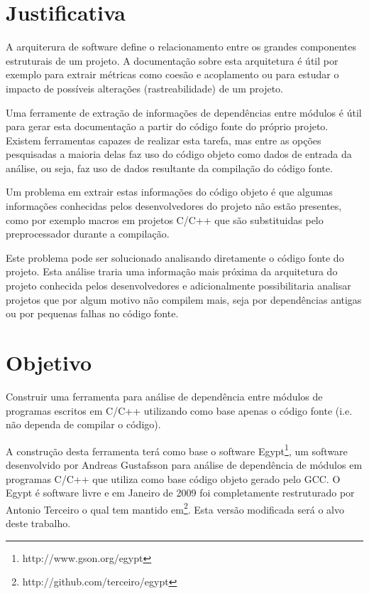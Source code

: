 \chapter{Justificativa}

A arquiterura de software define o relacionamento entre os grandes componentes
estruturais de um projeto\cite{EngenhariaDeSoftwarePressman}. A documentação
sobre esta arquitetura é útil por exemplo para extrair métricas como coesão e
acoplamento ou para estudar o impacto de possíveis alterações (rastreabilidade)
de um projeto\cite{mata26-terceiro-projeto-piloto}.

Uma ferramente de extração de informações de dependências entre módulos é útil
para gerar esta documentação a partir do código fonte do próprio projeto.
Existem ferramentas capazes de realizar esta tarefa, mas entre as opções
pesquisadas\cite{SourceVersusObjectCodeExtraction} a maioria delas faz uso do
código objeto como dados de entrada da análise, ou seja, faz uso de dados
resultante da compilação do código fonte.

Um problema em extrair estas informações do código objeto é que algumas
informações conhecidas pelos desenvolvedores do projeto não estão presentes,
como por exemplo macros em projetos C/C++ que são substituidas pelo
preprocessador\cite{SourceVersusObjectCodeExtraction} durante a compilação.

Este problema pode ser solucionado analisando diretamente o código fonte do
projeto. Esta análise traria uma informação mais próxima da arquitetura do
projeto conhecida pelos desenvolvedores e adicionalmente possibilitaria
analisar projetos que por algum motivo não compilem mais, seja por dependências
antigas ou por pequenas falhas no código fonte.

\chapter{Objetivo}

Construir uma ferramenta para análise de dependência entre módulos de programas
escritos em C/C++ utilizando como base apenas o código fonte (i.e.  não dependa
de compilar o código).

A construção desta ferramenta terá como base o software
Egypt\footnote{http://www.gson.org/egypt}, um software desenvolvido por Andreas
Gustafsson para análise de dependência de módulos em programas C/C++ que
utiliza como base código objeto gerado pelo GCC. O Egypt é software livre e em
Janeiro de 2009 foi completamente restruturado por Antonio Terceiro o qual tem
mantido em\footnote{http://github.com/terceiro/egypt}. Esta versão modificada
será o alvo deste trabalho.

